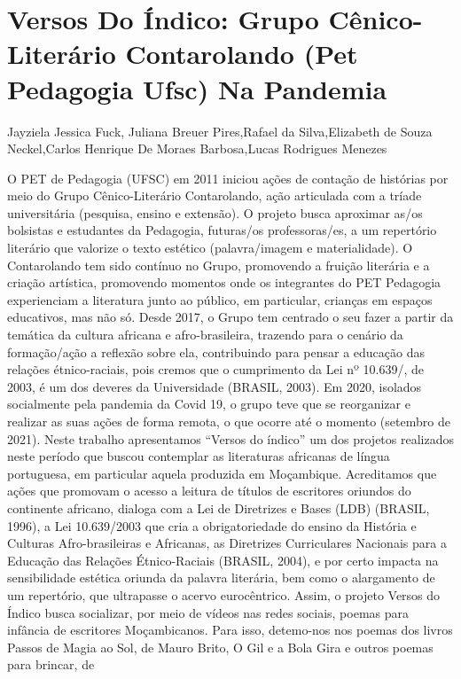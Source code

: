 \section*{Versos Do Índico: Grupo Cênico-Literário Contarolando (Pet  Pedagogia Ufsc) Na Pandemia}

Jayziela Jessica Fuck, Juliana Breuer Pires,Rafael da Silva,Elizabeth de  Souza Neckel,Carlos Henrique De Moraes Barbosa,Lucas Rodrigues Menezes

O PET de Pedagogia (UFSC) em 2011 iniciou ações de contação de histórias por meio do 
Grupo Cênico-Literário Contarolando, ação articulada com a tríade universitária (pesquisa, ensino 
e extensão). O projeto busca aproximar as/os bolsistas e estudantes da Pedagogia, futuras/os 
professoras/es, a um repertório literário que valorize o texto estético (palavra/imagem e 
materialidade). O Contarolando tem sido contínuo no Grupo, promovendo a fruição literária e a 
criação artística, promovendo momentos onde os integrantes do PET Pedagogia experienciam a 
literatura junto ao público, em particular, crianças em espaços educativos, mas não só. Desde 2017, 
o Grupo tem centrado o seu fazer a partir da temática da cultura africana e afro-brasileira, trazendo
para o cenário da formação/ação a reflexão sobre ela, contribuindo para pensar a educação das 
relações étnico-raciais, pois cremos que o cumprimento da Lei nº 10.639/, de 2003, é um dos 
deveres da Universidade (BRASIL, 2003). Em 2020, isolados socialmente pela pandemia da Covid 
19, o grupo teve que se reorganizar e realizar as suas ações de forma remota, o que ocorre até o 
momento (setembro de 2021). Neste trabalho apresentamos “Versos do índico” um dos projetos 
realizados neste período que buscou contemplar as literaturas africanas de língua portuguesa, em 
particular aquela produzida em Moçambique.
Acreditamos que ações que promovam o acesso a leitura de títulos de escritores oriundos 
do continente africano, dialoga com a Lei de Diretrizes e Bases (LDB) (BRASIL, 1996), a Lei 
10.639/2003 que cria a obrigatoriedade do ensino da História e Culturas Afro-brasileiras e 
Africanas, as Diretrizes Curriculares Nacionais para a Educação das Relações Étnico-Raciais 
(BRASIL, 2004), e por certo impacta na sensibilidade estética oriunda da palavra literária, bem 
como o alargamento de um repertório, que ultrapasse o acervo eurocêntrico. 
Assim, o projeto Versos do Índico busca socializar, por meio de vídeos nas redes sociais, 
poemas para infância de escritores Moçambicanos. Para isso, detemo-nos nos poemas dos livros 
Passos de Magia ao Sol, de Mauro Brito, O Gil e a Bola Gira e outros poemas para brincar, de 
